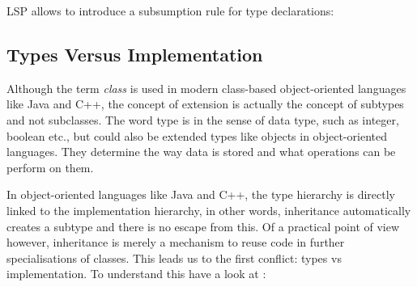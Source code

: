 LSP allows to introduce a subsumption rule for type declarations:

\begin{defn}[Subsumption]
\label{def:methodSubtyping}
	\begin{mathpar}
	\end{mathpar}
\end{defn}

\subsection{Types Versus Implementation}
\label{sec:sharingTypes}

Although the term \emph{class} is used in modern class-based
object-oriented languages like Java and C++, the concept of extension is
actually the concept of subtypes and not subclasses. The word type is in
the sense of data type, such as integer, boolean etc., but could also be
extended types like objects in object-oriented languages. They determine
the way data is stored and what operations can be perform on them.

In object-oriented languages like Java and C++, the type hierarchy
is directly linked to the implementation hierarchy, in other words,
inheritance automatically creates a subtype and there is no escape from
this. Of a practical point of view however, inheritance is merely a
mechanism to reuse code in further specialisations of classes. This leads
us to the first conflict: types vs implementation. To understand this have
a look at  \cite{simons_theory_2003-4}:

